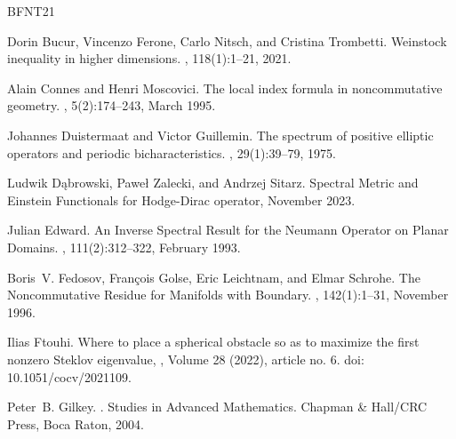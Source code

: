 \documentclass[11pt]{amsart}
\theoremstyle{definition}
\numberwithin{equation}{section}
\begin{document}

% 
\begin{thebibliography}{BFNT21}

    Dorin Bucur, Vincenzo Ferone, Carlo Nitsch, and Cristina Trombetti.
    \newblock Weinstock inequality in higher dimensions.
    , 118(1):1--21, 2021.
    
    Alain Connes and Henri Moscovici.
    \newblock The local index formula in noncommutative geometry.
    , 5(2):174--243, March 1995.
    
    Johannes Duistermaat and Victor Guillemin.
    \newblock The spectrum of positive elliptic operators and periodic
      bicharacteristics.
    , 29(1):39--79, 1975.
    
    Ludwik D{\k a}browski, Pawe{\l} Zalecki, and Andrzej Sitarz.
    \newblock Spectral {{Metric}} and {{Einstein Functionals}} for {{Hodge-Dirac}}
      operator, November 2023.
    
    Julian Edward.
    \newblock An {{Inverse Spectral Result}} for the {{Neumann Operator}} on
      {{Planar Domains}}.
    , 111(2):312--322, February 1993.
    
    Boris~V. Fedosov, Fran{\c c}ois Golse, Eric Leichtnam, and Elmar Schrohe.
    \newblock The {{Noncommutative Residue}} for {{Manifolds}} with {{Boundary}}.
    , 142(1):1--31, November 1996.
    
    Ilias Ftouhi.
    \newblock Where to place a spherical obstacle so as to maximize the first
      nonzero Steklov eigenvalue,
      , Volume 28 (2022), article no. 6. doi: 10.1051/cocv/2021109.
    
    Peter~B. Gilkey.
    .
    \newblock Studies in Advanced Mathematics. Chapman \& Hall/CRC Press, Boca
      Raton, 2004.
    

\end{thebibliography}
\end{document}
